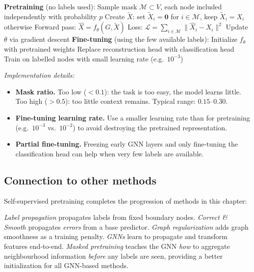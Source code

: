 \begin{notechapter}
\begin{algorithm}[H]
\caption{Masked feature pretraining and fine-tuning}
\label{semi-supervised-graphs:alg:masked_pretrain}
\begin{algorithmic}[1]
\State \textbf{Pretraining} (no labels used):
    \State Sample mask $\mathcal{M} \subset V$, each node included
           independently with probability $p$
    \State Create $\tilde{X}$: set $\tilde{X}_i = \mathbf{0}$ for
           $i \in \mathcal{M}$, keep $\tilde{X}_i = X_i$ otherwise
    \State Forward pass: $\hat{X} = f_\theta(G, \tilde{X})$
    \State Loss: $\mathcal{L} = \sum_{i \in \mathcal{M}}
           \|\hat{X}_i - X_i\|^2$
    \State Update $\theta$ via gradient descent
\EndFor
\State
\State \textbf{Fine-tuning} (using the few available labels):
\State Initialize $f_\theta$ with pretrained weights
\State Replace reconstruction head with classification head
\State Train on labelled nodes with small learning rate (e.g.\ $10^{-3}$)
\end{algorithmic}
\end{algorithm}

\begin{pitfall}
\emph{Implementation details:}
\begin{itemize}
    \item \textbf{Mask ratio.} Too low ($<0.1$): the task is too easy, the
          model learns little. Too high ($>0.5$): too little context remains.
          Typical range: $0.15$--$0.30$.
    \item \textbf{Fine-tuning learning rate.} Use a smaller learning rate
          than for pretraining (e.g.\ $10^{-3}$ vs.\ $10^{-2}$) to avoid
          destroying the pretrained representation.
    \item \textbf{Partial fine-tuning.} Freezing early GNN layers and only
          fine-tuning the classification head can help when very few labels
          are available.
\end{itemize}
\end{pitfall}

\subsection{Connection to other methods}

Self-supervised pretraining completes the progression of methods in this
chapter:

\emph{Label propagation} propagates labels from fixed boundary nodes.
\emph{Correct \& Smooth} propagates \emph{errors} from a base predictor.
\emph{Graph regularization} adds graph smoothness as a training penalty.
\emph{GNNs} learn to propagate and transform features end-to-end.
\emph{Masked pretraining} teaches the GNN \emph{how} to aggregate
neighbourhood information \emph{before} any labels are seen, providing a
better initialization for all GNN-based methods.


\end{notechapter}
